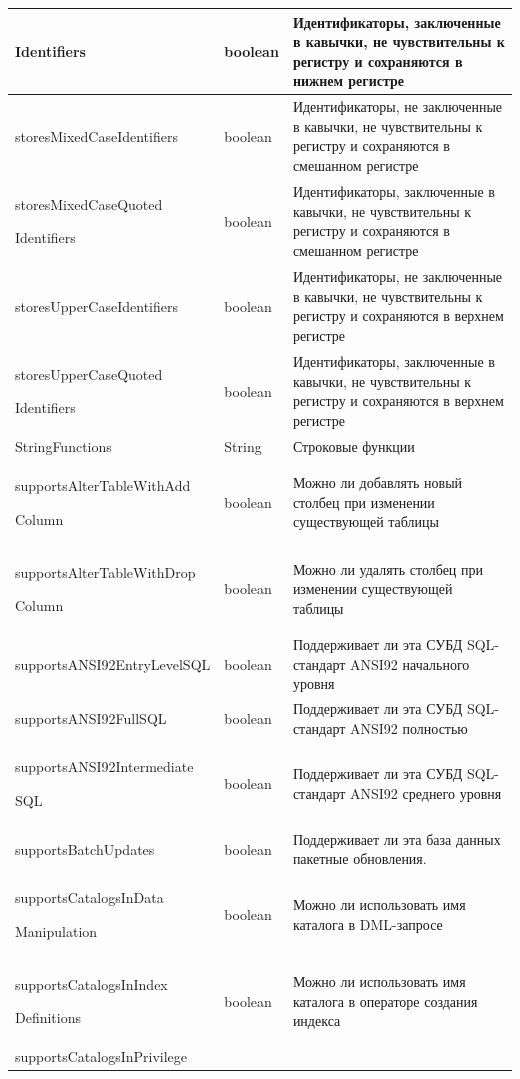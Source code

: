 \begin{longtable}[c]{|>{\ttfamily}m{5.1cm}|>{\ttfamily\centering}m{1.3cm}|m{9.2cm}|}
	Identifiers & boolean & Идентификаторы, заключенные в кавычки, не чувствительны к регистру и сохраняются в нижнем регистре\\\hline 
	storesMixedCaseIdentifiers & boolean &  Идентификаторы, не заключенные в кавычки, не чувствительны к регистру и сохраняются в смешанном регистре\\\hline 
	storesMixedCaseQuoted
	
	Identifiers & boolean & Идентификаторы, заключенные в кавычки, не чувствительны к регистру и сохраняются в смешанном регистре\\\hline 
	storesUpperCaseIdentifiers & boolean & Идентификаторы, не заключенные в кавычки, не чувствительны к регистру и сохраняются в верхнем регистре\\\hline 
	storesUpperCaseQuoted
	
	Identifiers & boolean & Идентификаторы, заключенные в кавычки, не чувствительны к регистру и сохраняются в верхнем регистре\\\hline 
	StringFunctions & String & Строковые функции\\\hline 
	supportsAlterTableWithAdd
	
	Column & boolean & Можно ли добавлять новый столбец при изменении существующей таблицы\\\hline 
	supportsAlterTableWithDrop
	
	Column & boolean & Можно ли удалять столбец при изменении существующей таблицы\\\hline 
	supportsANSI92EntryLevelSQL & boolean & Поддерживает ли эта СУБД SQL-стандарт ANSI92 начального уровня\\\hline 
	supportsANSI92FullSQL & boolean & Поддерживает ли эта СУБД SQL-стандарт ANSI92 полностью\\\hline 
	supportsANSI92Intermediate
	
	SQL & boolean & Поддерживает ли эта СУБД SQL-стандарт ANSI92 среднего уровня\\\hline 
	supportsBatchUpdates & boolean & Поддерживает ли эта база данных пакетные обновления.\\\hline 
	supportsCatalogsInData
	
	Manipulation & boolean & Можно ли использовать имя каталога в DML-запросе\\\hline 
	supportsCatalogsInIndex
	
	Definitions & boolean & Можно ли использовать имя каталога в операторе создания индекса\\\hline 
	supportsCatalogsInPrivilege
	

\end{longtable}
